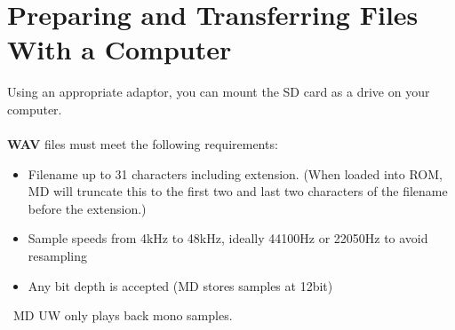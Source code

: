\section{Preparing and Transferring Files With a Computer}
Using an appropriate adaptor, you can mount the SD card as a drive on your computer. \\
\\
\textbf{WAV} files must meet the following requirements:
\begin{itemize}
    \item Filename up to 31 characters including extension. (When loaded into ROM, MD will truncate this to the first two and last two characters of the filename before the extension.)
    \item Sample speeds from 4kHz to 48kHz, ideally 44100Hz or 22050Hz to avoid resampling
    \item Any bit depth is accepted (MD stores samples at 12bit)\newline
\end{itemize}
\
MD UW only plays back mono samples.